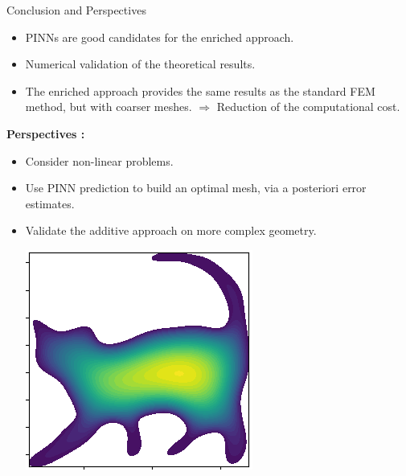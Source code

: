 \begin{frame}[label={lastslide}]{Conclusion and Perspectives}
	\begin{itemize}
		\item PINNs are good candidates for the enriched approach. 
		\item Numerical validation of the theoretical results.
		\item The enriched approach provides the same results as the standard FEM method, but with coarser meshes.
		$\Rightarrow$ Reduction of the computational cost.
	\end{itemize}

	\textbf{Perspectives :}

	\begin{itemize}
		\item Consider non-linear problems. 
		\item Use PINN prediction to build an optimal mesh, via a posteriori error estimates.
		\item Validate the additive approach on more complex geometry.
		
		\centering
		\vspace{7pt}
		\includegraphics[width=0.3\linewidth]{images/conclu_cat.png}
	\end{itemize}
\end{frame}

